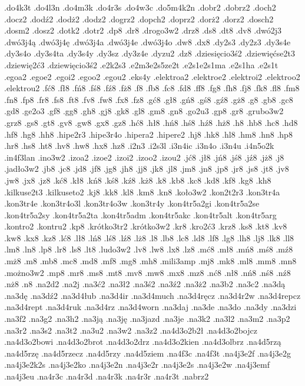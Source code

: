 {.do4k3t
.do4l3n
.do4m3k
.do4r3s
.do4w3c
.do5m4k2n
.dobr2
.dobrz2
.doch2
.docz2
.dodź2
.dodż2
.dodz2
.dogrz2
.dopch2
.doprz2
.dorż2
.dorz2
.dosch2
.dosm2
.dosz2
.dotk2
.dotr2
.dp8
.dr8
.drogo3w2
.drz8
.ds8
.dt8
.dv8
.dwó2j3
.dwó3j4ą
.dwó3j4ę
.dwó3j4a
.dwó3j4e
.dwó3j4o
.dw8
.dx8
.dy2s3
.dy2z3
.dy3s4e
.dy3s4o
.dy3s4ta
.dy3s4y
.dy3sz
.dy3z4e
.dyzu2
.dz8
.dziesięcio3ś2
.dziewięćse2t3
.dziewię2ć3
.dziewięcio3ś2
.e2k2s3
.e2m3e2s5ze2t
.e2s1e2s1ma
.e2s1ha
.e2s1t
.egoa2
.egoe2
.egoi2
.egoo2
.egou2
.eks4y
.elektroa2
.elektroe2
.elektroi2
.elektroo2
.elektrou2
.fć8
.fł8
.fń8
.fś8
.fź8
.fż8
.f8
.fb8
.fc8
.fd8
.ff8
.fg8
.fh8
.fj8
.fk8
.fl8
.fm8
.fn8
.fp8
.fr8
.fs8
.ft8
.fv8
.fw8
.fx8
.fz8
.gć8
.gł8
.gń8
.gś8
.gź8
.gż8
.g8
.gb8
.gc8
.gd8
.ge2o3
.gf8
.gg8
.gh8
.gj8
.gk8
.gl8
.gm8
.gn8
.go2u3
.gp8
.gr8
.grubo3w2
.grz8
.gs8
.gt8
.gv8
.gw8
.gx8
.gz8
.hć8
.hł8
.hń8
.hś8
.hź8
.hż8
.h8
.hb8
.hc8
.hd8
.hf8
.hg8
.hh8
.hipe2r3
.hipe3r4o
.hipera2
.hipere2
.hj8
.hk8
.hl8
.hm8
.hn8
.hp8
.hr8
.hs8
.ht8
.hv8
.hw8
.hx8
.hz8
.i2n3
.i2s3l
.i3n4ic
.i3n4o
.i3n4u
.i4n5o2k
.in4f3lan
.ino3w2
.izoa2
.izoe2
.izoi2
.izoo2
.izou2
.jć8
.jł8
.jń8
.jś8
.jź8
.jż8
.j8
.jadło3w2
.jb8
.jc8
.jd8
.jf8
.jg8
.jh8
.jj8
.jk8
.jl8
.jm8
.jn8
.jp8
.jr8
.js8
.jt8
.jv8
.jw8
.jx8
.jz8
.kć8
.kł8
.kń8
.kś8
.kź8
.kż8
.k8
.kb8
.kc8
.kd8
.kf8
.kg8
.kh8
.kilkuse2t3
.kilkuseto2
.kj8
.kk8
.kl8
.km8
.kn8
.koło3w2
.kon2t2r3
.kon3tr4a
.kon3tr4e
.kon3tr4o3l
.kon3tr4o3w
.kon3tr4y
.kon4tr5a2gi
.kon4tr5a2se
.kon4tr5a2sy
.kon4tr5a2ta
.kon4tr5adm
.kon4tr5akc
.kon4tr5alt
.kon4tr5arg
.kontro2
.kontru2
.kp8
.krótko3tr2
.krótko3w2
.kr8
.kro2ć3
.krz8
.ks8
.kt8
.kv8
.kw8
.kx8
.kz8
.lć8
.lł8
.lń8
.lś8
.lź8
.lż8
.l8
.lb8
.lc8
.ld8
.lf8
.lg8
.lh8
.lj8
.lk8
.ll8
.lm8
.ln8
.lp8
.lr8
.ls8
.lt8
.ludo3w2
.lv8
.lw8
.lx8
.lz8
.mć8
.mł8
.mń8
.mś8
.mź8
.mż8
.m8
.mb8
.mc8
.md8
.mf8
.mg8
.mh8
.mili3amp
.mj8
.mk8
.ml8
.mm8
.mn8
.możno3w2
.mp8
.mr8
.ms8
.mt8
.mv8
.mw8
.mx8
.mz8
.nć8
.nł8
.nń8
.nś8
.nź8
.nż8
.n8
.na2d2
.na2j
.na3ć2
.na3ł2
.na3ś2
.na3ź2
.na3ż2
.na3b2
.na3c2
.na3dą
.na3dę
.na3dź2
.na3d4łub
.na3d4ir
.na3d4much
.na3d4ręcz
.na3d4r2w
.na3d4repcz
.na3d4rept
.na3d4ruk
.na3d4rz
.na3d4worn
.na3daj
.na3de
.na3do
.na3dy
.na3dzi
.na3f2
.na3g2
.na3h2
.na3ją
.na3ję
.na3jazd
.na3je
.na3k2
.na3l2
.na3m2
.na3p2
.na3r2
.na3s2
.na3t2
.na3u2
.na3w2
.na3z2
.na4d3o2b2ł
.na4d3o2bojcz
.na4d3o2bowi
.na4d3o2brot
.na4d3o2drz
.na4d3o2kien
.na4d3olbrz
.na4d5rzą
.na4d5rzę
.na4d5rzecz
.na4d5rzy
.na4d5ziem
.na4f3c
.na4f3t
.na4j3e2f
.na4j3e2g
.na4j3e2k2s
.na4j3e2ko
.na4j3e2n
.na4j3e2r
.na4j3e2s
.na4j3e2w
.na4j3emf
.na4j3eu
.na4r3c
.na4r3d
.na4r3k
.na4r3r
.na4r3t
.nabrz2
}
